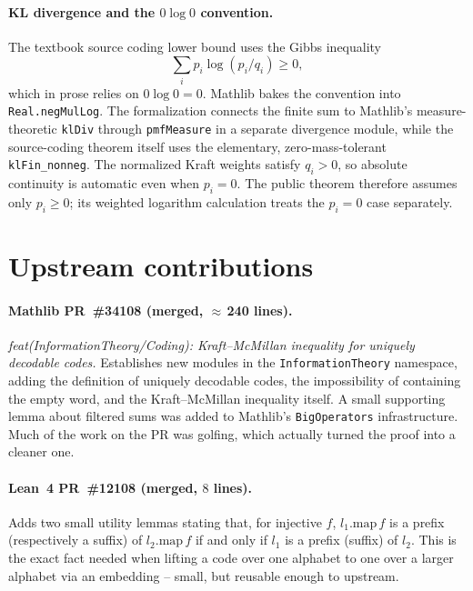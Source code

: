 \documentclass[11pt]{article}
\begin{document}
\paragraph{KL divergence and the $0 \log 0$ convention.} The textbook
source coding lower bound uses the Gibbs inequality
\[
  \sum_i p_i \log(p_i/q_i) \ge 0,
\]
which in prose relies on $0 \log 0 = 0$. \textsf{Mathlib} bakes the
convention into \texttt{Real.negMulLog}. The formalization connects the
finite sum to \textsf{Mathlib}'s measure-theoretic \texttt{klDiv} through
\texttt{pmfMeasure} in a separate divergence module, while the source-coding
theorem itself uses the elementary, zero-mass-tolerant
\texttt{klFin\_nonneg}. The normalized Kraft
weights satisfy $q_i>0$, so absolute continuity is automatic even when
$p_i=0$. The public theorem therefore assumes only $p_i\geq 0$; its
weighted logarithm calculation treats the $p_i=0$ case separately.

\section{Upstream contributions}
\label{sec:upstream}

\paragraph{\textsf{Mathlib} PR~\#34108 (merged, $\approx$\,240 lines).}
\emph{feat(InformationTheory/Coding): Kraft--McMillan inequality for
uniquely decodable codes.} Establishes new
 modules in the
\texttt{InformationTheory} namespace, adding the
definition of uniquely decodable codes, the impossibility of containing
the empty word, and the Kraft--McMillan inequality itself. A small
supporting lemma about filtered sums was added to \textsf{Mathlib}'s
\texttt{BigOperators} infrastructure. Much of the work on the PR was golfing, which actually turned the proof into a cleaner one.

\paragraph{\textsf{Lean~4} PR~\#12108 (merged, $8$ lines).} Adds two
small utility lemmas stating that, for injective $f$, $l_1.\mathrm{map}\,f$
is a prefix (respectively a suffix) of $l_2.\mathrm{map}\,f$ if and only
if $l_1$ is a prefix (suffix) of $l_2$. This is the exact fact needed
when lifting a code over one alphabet to one over a larger alphabet via
an embedding -- small, but reusable enough to upstream.
\end{document}
